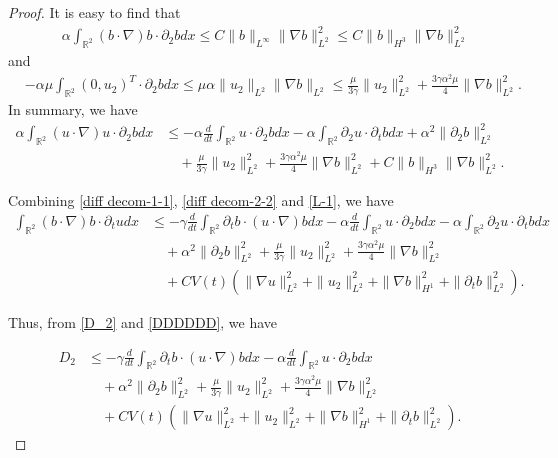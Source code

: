 \documentclass[reqno,11pt]{amsart}
\def\R{\mathbb R}
\numberwithin{Thm}{section}
\begin{document}
\begin{proof}
It is easy to find that
\begin{align*}
&\alpha\int_{\R^2}(b\cdot\nabla) b\cdot\partial_2 bdx\leq C\|b\|_{L^{\infty}}\|\nabla b\|_{L^{2}}^2\leq C\| b\|_{H^{3}}\|\nabla b\|_{L^{2}}^2
\end{align*}
and
\begin{align*}
&-\alpha\mu\int_{\R^2}(0,u_2)^{T}\cdot\partial_2 bdx\leq\mu\alpha\|u_2\|_{L^{2}}\|\nabla b\|_{L^{2}}\leq \frac{\mu}{3\gamma}\| u_2\|_{L^{2}}^{2}+\frac{3\gamma\alpha^2\mu}{4}\|\nabla b\|_{L^{2}}^2.
\end{align*}
In summary, we have
 \begin{align}\label{L-1}
\alpha\int_{\R^2}(u\cdot \nabla) u\cdot\partial_2 bdx
&\leq-\alpha\frac{d}{dt}\int_{\R^2}u\cdot\partial_2 bdx-\alpha\int_{\R^2}\partial_2u\cdot\partial_t bdx+\alpha^2\|\partial_2b\|_{L^2}^2\nonumber\\
&\quad+\frac{\mu}{3\gamma}\| u_2\|_{L^{2}}^{2}+\frac{3\gamma\alpha^2\mu}{4}\|\nabla b\|_{L^{2}}^2+ C\|b\|_{H^3}\|\nabla b\|_{L^2}^2.
\end{align}

Combining \eqref{diff decom-1-1},  \eqref{diff decom-2-2} and \eqref{L-1}, we have
\begin{align}\label{DDDDDD}
\int_{\R^2}(b\cdot \nabla)b\cdot \partial_tudx&\leq-\gamma\frac{d}{dt}\int_{\R^2}\partial_{t}b\cdot (u\cdot\nabla) bdx-\alpha\frac{d}{dt}\int_{\R^2}u\cdot\partial_2 bdx-\alpha\int_{\R^2}\partial_2u\cdot\partial_t bdx\nonumber\\
&\quad+\alpha^2\|\partial_2b\|_{L^2}^2+\frac{\mu}{3\gamma}\| u_2\|_{L^{2}}^{2}+\frac{3\gamma\alpha^2\mu}{4}\|\nabla b\|_{L^{2}}^2\nonumber\\
&\quad+CV(t)\left(\|\nabla u\|_{L^{2}}^2+\|u_2\|_{L^2}^2+\|\nabla b\|_{H^1}^2+\|\partial_tb\|_{L^{2}}^2\right).
\end{align}

 Thus, from \eqref{D_2} and \eqref{DDDDDD}, we have

\begin{align}\label{DDDDDD1}
D_2&\leq-\gamma\frac{d}{dt}\int_{\R^2}\partial_{t}b\cdot (u\cdot\nabla) bdx-\alpha\frac{d}{dt}\int_{\R^2}u\cdot\partial_2 bdx\nonumber\\
&\quad+\alpha^2\|\partial_2b\|_{L^2}^2+\frac{\mu}{3\gamma}\| u_2\|_{L^{2}}^{2}+\frac{3\gamma\alpha^2\mu}{4}\|\nabla b\|_{L^{2}}^2\nonumber\\
&\quad+CV(t)\left(\|\nabla u\|_{L^{2}}^2+\|u_2\|_{L^2}^2+\|\nabla b\|_{H^1}^2+\|\partial_tb\|_{L^{2}}^2\right).
\end{align}



\end{proof}
\end{document}
